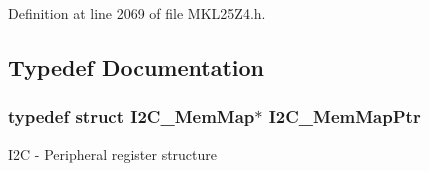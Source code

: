 Definition at line 2069 of file M\+K\+L25\+Z4.\+h.



\subsection{Typedef Documentation}
\subsubsection[{\texorpdfstring{I2\+C\+\_\+\+Mem\+Map\+Ptr}{I2C_MemMapPtr}}]{\setlength{\rightskip}{0pt plus 5cm}typedef struct {\bf I2\+C\+\_\+\+Mem\+Map}$\ast$ {\bf I2\+C\+\_\+\+Mem\+Map\+Ptr}}\hypertarget{group___i2_c___peripheral_ga9902bc02a12982d0c37ec011b4dd89f0}{}\label{group___i2_c___peripheral_ga9902bc02a12982d0c37ec011b4dd89f0}
I2C -\/ Peripheral register structure 